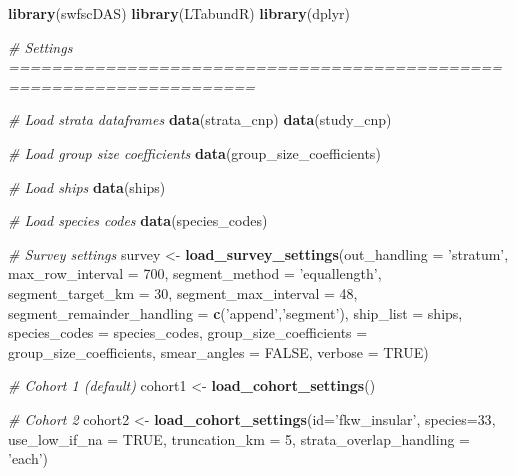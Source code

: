 \documentclass[
]{book}
\newenvironment{Shaded}{\begin{snugshade}}{\end{snugshade}}
\newcommand{\CommentTok}[1]{\textcolor[rgb]{0.56,0.35,0.01}{\textit{#1}}}
\newcommand{\DataTypeTok}[1]{\textcolor[rgb]{0.13,0.29,0.53}{#1}}
\newcommand{\DecValTok}[1]{\textcolor[rgb]{0.00,0.00,0.81}{#1}}
\newcommand{\KeywordTok}[1]{\textcolor[rgb]{0.13,0.29,0.53}{\textbf{#1}}}
\newcommand{\NormalTok}[1]{#1}
\newcommand{\OtherTok}[1]{\textcolor[rgb]{0.56,0.35,0.01}{#1}}
\newcommand{\StringTok}[1]{\textcolor[rgb]{0.31,0.60,0.02}{#1}}
\begin{document}
\begin{Shaded}
\begin{Highlighting}[]
\KeywordTok{library}\NormalTok{(swfscDAS)}
\KeywordTok{library}\NormalTok{(LTabundR)}
\KeywordTok{library}\NormalTok{(dplyr)}

\CommentTok{# Settings =====================================================================}

\CommentTok{# Load strata dataframes}
\KeywordTok{data}\NormalTok{(strata_cnp)}
\KeywordTok{data}\NormalTok{(study_cnp)}

\CommentTok{# Load group size coefficients}
\KeywordTok{data}\NormalTok{(group_size_coefficients)}

\CommentTok{# Load ships}
\KeywordTok{data}\NormalTok{(ships)}

\CommentTok{# Load species codes}
\KeywordTok{data}\NormalTok{(species_codes)}

\CommentTok{# Survey settings}
\NormalTok{survey <-}\StringTok{ }
\StringTok{  }\KeywordTok{load_survey_settings}\NormalTok{(}\DataTypeTok{out_handling =} \StringTok{'stratum'}\NormalTok{,}
                       \DataTypeTok{max_row_interval =} \DecValTok{700}\NormalTok{,}
                       \DataTypeTok{segment_method =} \StringTok{'equallength'}\NormalTok{,}
                       \DataTypeTok{segment_target_km =} \DecValTok{30}\NormalTok{,}
                       \DataTypeTok{segment_max_interval =} \DecValTok{48}\NormalTok{,}
                       \DataTypeTok{segment_remainder_handling =} \KeywordTok{c}\NormalTok{(}\StringTok{'append'}\NormalTok{,}\StringTok{'segment'}\NormalTok{),}
                       \DataTypeTok{ship_list =}\NormalTok{ ships,}
                       \DataTypeTok{species_codes =}\NormalTok{ species_codes,}
                       \DataTypeTok{group_size_coefficients =}\NormalTok{ group_size_coefficients,}
                       \DataTypeTok{smear_angles =} \OtherTok{FALSE}\NormalTok{,}
                       \DataTypeTok{verbose =} \OtherTok{TRUE}\NormalTok{)}

\CommentTok{# Cohort 1 (default)}
\NormalTok{cohort1 <-}\StringTok{ }\KeywordTok{load_cohort_settings}\NormalTok{()}

\CommentTok{# Cohort 2}
\NormalTok{cohort2 <-}\StringTok{ }
\StringTok{  }\KeywordTok{load_cohort_settings}\NormalTok{(}\DataTypeTok{id=}\StringTok{'fkw_insular'}\NormalTok{,}
                       \DataTypeTok{species=}\DecValTok{33}\NormalTok{,}
                       \DataTypeTok{use_low_if_na =} \OtherTok{TRUE}\NormalTok{,}
                       \DataTypeTok{truncation_km =} \DecValTok{5}\NormalTok{,}
                       \DataTypeTok{strata_overlap_handling =} \StringTok{'each'}\NormalTok{)}


\end{Highlighting}
\end{Shaded}
\end{document}
